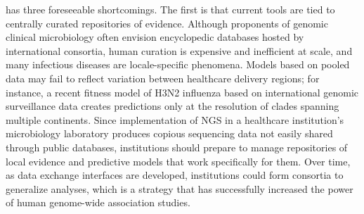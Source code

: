 has three foreseeable shortcomings. The first is that current tools are tied to centrally curated repositories of evidence. Although proponents of genomic clinical microbiology often envision encyclopedic databases hosted by international consortia,\autocite{Didelot2012,Koser2012} human curation is expensive and inefficient at scale, and many infectious diseases are locale-specific phenomena. Models based on pooled data may fail to reflect variation between healthcare delivery regions;\autocite{Reis2003,Wiens2014} for instance, a recent fitness model of H3N2 influenza based on international genomic surveillance data creates predictions only at the resolution of clades spanning multiple continents.\autocite{Luksza2014} Since implementation of NGS in a healthcare institution’s microbiology laboratory produces copious sequencing data not easily shared through public databases, institutions should prepare to manage repositories of local evidence and predictive models that work specifically for them. Over time, as data exchange interfaces are developed, institutions could form consortia to generalize analyses, which is a strategy that has successfully increased the power of human genome-wide association studies.

\newcommand*{\tabindent}{\hspace*{1em}}%

